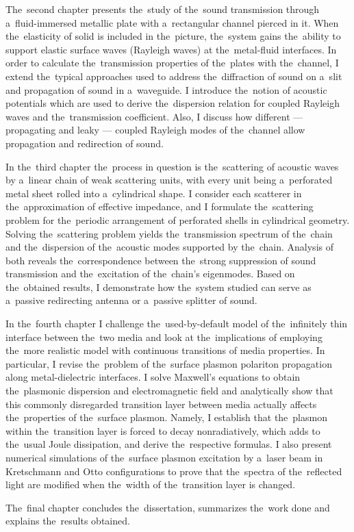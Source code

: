The~second chapter presents the~study of the~sound transmission through a~fluid-immersed metallic plate with a~rectangular channel pierced in it.
When the~elasticity of solid is included in the~picture, the~system gains the~ability to support elastic surface waves (Rayleigh waves) at the~metal-fluid interfaces.
In order to calculate the~transmission properties of the~plates with the~channel, I extend the~typical approaches used to address the~diffraction of sound on a~slit and propagation of sound in a~waveguide.
I introduce the~notion of acoustic potentials which are used to derive the~dispersion relation for coupled Rayleigh waves and the~transmission coefficient.
Also, I discuss how different --- propagating and leaky --- coupled Rayleigh modes of the~channel allow propagation and redirection of sound.

In the~third chapter the~process in question is the~scattering of acoustic waves by a~linear chain of weak scattering units, with every unit being a~perforated metal sheet rolled into a~cylindrical shape.
I consider each scatterer in the~approximation of effective impedance, and I formulate the~scattering problem for the~periodic arrangement of perforated shells in cylindrical geometry.
Solving the~scattering problem yields the~transmission spectrum of the~chain and the~dispersion of the~acoustic modes supported by the~chain.
Analysis of both reveals the~correspondence between the~strong suppression of sound transmission and the~excitation of the~chain's eigenmodes.
Based on the~obtained results, I demonstrate how the~system studied can serve as a~passive redirecting antenna or a~passive splitter of sound.

In the~fourth chapter I challenge the~used-by-default model of the~infinitely thin interface between the~two media and look at the~implications of employing the~more realistic model with continuous transitions of media properties.
In particular, I revise the~problem of the~surface plasmon polariton propagation along metal-dielectric interfaces.
I solve Maxwell's equations to obtain the~plasmonic dispersion and electromagnetic field and analytically show that this commonly disregarded transition layer between media actually affects the~properties of the~surface plasmon.
Namely, I establish that the~plasmon within the~transition layer is forced to decay nonradiatively, which adds to the~usual Joule dissipation, and derive the~respective formulas.
I also present numerical simulations of the~surface plasmon excitation by a~laser beam in Kretschmann and Otto configurations to prove that the~spectra of the~reflected light are modified when the~width of the~transition layer is changed.

The~final chapter concludes the~dissertation, summarizes the~work done and explains the~results obtained.


